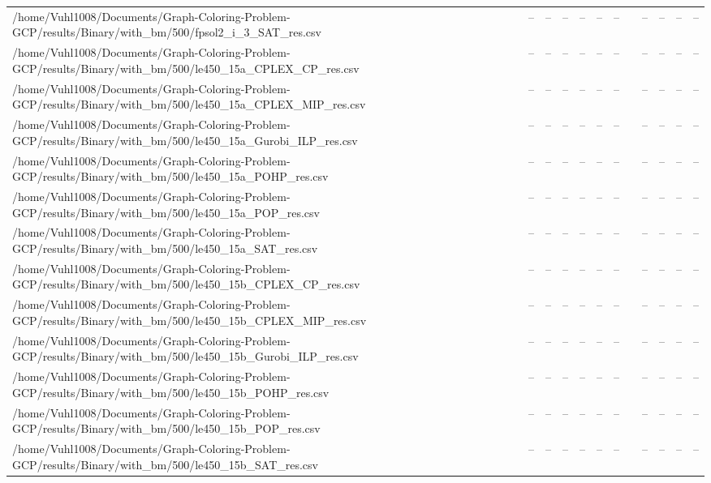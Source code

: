\begin{table}[htbp]
\begin{tabular}{llllllllllll}
/home/Vuhl1008/Documents/Graph-Coloring-Problem-GCP/results/Binary/with\_bm/500/fpsol2\_i\_3\_SAT\_res.csv & -- & -- & -- & -- & -- & -- & {} & -- & -- & -- & -- \\
/home/Vuhl1008/Documents/Graph-Coloring-Problem-GCP/results/Binary/with\_bm/500/le450\_15a\_CPLEX\_CP\_res.csv & -- & -- & -- & -- & -- & -- & {} & -- & -- & -- & -- \\
/home/Vuhl1008/Documents/Graph-Coloring-Problem-GCP/results/Binary/with\_bm/500/le450\_15a\_CPLEX\_MIP\_res.csv & -- & -- & -- & -- & -- & -- & {} & -- & -- & -- & -- \\
/home/Vuhl1008/Documents/Graph-Coloring-Problem-GCP/results/Binary/with\_bm/500/le450\_15a\_Gurobi\_ILP\_res.csv & -- & -- & -- & -- & -- & -- & {} & -- & -- & -- & -- \\
/home/Vuhl1008/Documents/Graph-Coloring-Problem-GCP/results/Binary/with\_bm/500/le450\_15a\_POHP\_res.csv & -- & -- & -- & -- & -- & -- & {} & -- & -- & -- & -- \\
/home/Vuhl1008/Documents/Graph-Coloring-Problem-GCP/results/Binary/with\_bm/500/le450\_15a\_POP\_res.csv & -- & -- & -- & -- & -- & -- & {} & -- & -- & -- & -- \\
/home/Vuhl1008/Documents/Graph-Coloring-Problem-GCP/results/Binary/with\_bm/500/le450\_15a\_SAT\_res.csv & -- & -- & -- & -- & -- & -- & {} & -- & -- & -- & -- \\
/home/Vuhl1008/Documents/Graph-Coloring-Problem-GCP/results/Binary/with\_bm/500/le450\_15b\_CPLEX\_CP\_res.csv & -- & -- & -- & -- & -- & -- & {} & -- & -- & -- & -- \\
/home/Vuhl1008/Documents/Graph-Coloring-Problem-GCP/results/Binary/with\_bm/500/le450\_15b\_CPLEX\_MIP\_res.csv & -- & -- & -- & -- & -- & -- & {} & -- & -- & -- & -- \\
/home/Vuhl1008/Documents/Graph-Coloring-Problem-GCP/results/Binary/with\_bm/500/le450\_15b\_Gurobi\_ILP\_res.csv & -- & -- & -- & -- & -- & -- & {} & -- & -- & -- & -- \\
/home/Vuhl1008/Documents/Graph-Coloring-Problem-GCP/results/Binary/with\_bm/500/le450\_15b\_POHP\_res.csv & -- & -- & -- & -- & -- & -- & {} & -- & -- & -- & -- \\
/home/Vuhl1008/Documents/Graph-Coloring-Problem-GCP/results/Binary/with\_bm/500/le450\_15b\_POP\_res.csv & -- & -- & -- & -- & -- & -- & {} & -- & -- & -- & -- \\
/home/Vuhl1008/Documents/Graph-Coloring-Problem-GCP/results/Binary/with\_bm/500/le450\_15b\_SAT\_res.csv & -- & -- & -- & -- & -- & -- & {} & -- & -- & -- & -- \\

\end{tabular}
\end{table}
